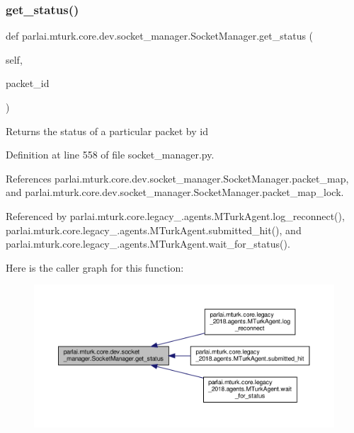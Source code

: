 \subsubsection{\texorpdfstring{get\+\_\+status()}{get\_status()}}
{\footnotesize\ttfamily def parlai.\+mturk.\+core.\+dev.\+socket\+\_\+manager.\+Socket\+Manager.\+get\+\_\+status (\begin{DoxyParamCaption}\item[{}]{self,  }\item[{}]{packet\+\_\+id }\end{DoxyParamCaption})}

\begin{DoxyVerb}Returns the status of a particular packet by id\end{DoxyVerb}
 

Definition at line 558 of file socket\+\_\+manager.\+py.



References parlai.\+mturk.\+core.\+dev.\+socket\+\_\+manager.\+Socket\+Manager.\+packet\+\_\+map, and parlai.\+mturk.\+core.\+dev.\+socket\+\_\+manager.\+Socket\+Manager.\+packet\+\_\+map\+\_\+lock.



Referenced by parlai.\+mturk.\+core.\+legacy\+\_.\+agents.\+M\+Turk\+Agent.\+log\+\_\+reconnect(), parlai.\+mturk.\+core.\+legacy\+\_.\+agents.\+M\+Turk\+Agent.\+submitted\+\_\+hit(), and parlai.\+mturk.\+core.\+legacy\+\_.\+agents.\+M\+Turk\+Agent.\+wait\+\_\+for\+\_\+status().

Here is the caller graph for this function\+:
\nopagebreak
\begin{figure}[H]
\begin{center}
\leavevmode
\includegraphics[width=350pt]{classparlai_1_1mturk_1_1core_1_1dev_1_1socket__manager_1_1SocketManager_afc9c7c9efb6fe26e981902f6c02557ee_icgraph}
\end{center}
\end{figure}
\mbox{\label{classparlai_1_1mturk_1_1core_1_1dev_1_1socket__manager_1_1SocketManager_a9e2141e20af4e7d1f8a42837ed07f380}} 
